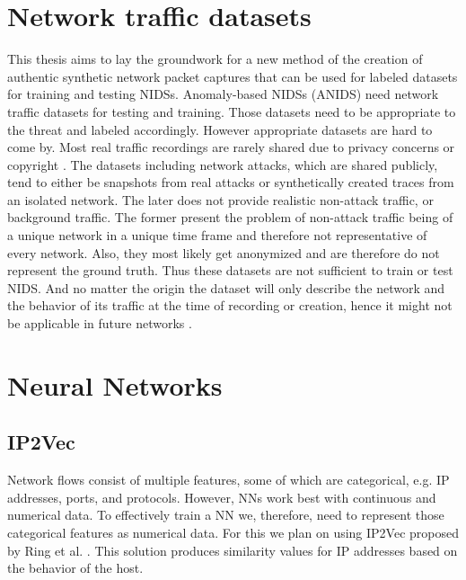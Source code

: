 \documentclass[
	ngerman,
	ruledheaders=section,%
	class=report,%
	thesis={type=bachelor},%
	accentcolor=9c,%
	custommargins=true,%
	marginpar=false,%
	parskip=half-,%
	fontsize=11pt,%
]{tudapub}
\begin{document}
\section{Network traffic datasets}

This thesis aims to lay the groundwork for a new method of the creation of authentic synthetic network packet captures
that can be used for labeled datasets for training and testing NIDSs.
Anomaly-based NIDSs (ANIDS) need network traffic datasets for testing and training.
Those datasets need to be appropriate to the threat and labeled accordingly.
However appropriate datasets are hard to come by.
Most real traffic recordings are rarely shared due to privacy concerns \cite{ringFlowbasedNetworkTraffic2019a} or copyright \cite{corderoID2TDIYDataset2015}.
The datasets including network attacks,
which are shared publicly,
tend to either be snapshots from real attacks or synthetically created traces from an isolated network.
The later does not provide realistic non-attack traffic, or background traffic.
The former present the problem of non-attack traffic being of a unique network in a unique time frame and therefore not representative of every network.
Also, they most likely get anonymized and are therefore do not represent the ground truth.
Thus these datasets are not sufficient to train or test NIDS.
And no matter the origin the dataset will only describe the network and the behavior of its traffic at the time of recording or creation, hence it might not be applicable in future networks \cite{ringFlowbasedNetworkTraffic2019a}.



\section{Neural Networks}

\subsection{IP2Vec}

Network flows consist of multiple features, some of which are categorical, e.g. IP addresses, ports, and protocols.
However, NNs work best with continuous and numerical data.
To effectively train a NN we, therefore, need to represent those categorical features as numerical data.
For this we plan on using IP2Vec proposed by Ring et al. \cite{ringIP2VecLearningSimilarities2017}.
This solution produces similarity values for IP addresses based on the behavior of the host.
\end{document}
